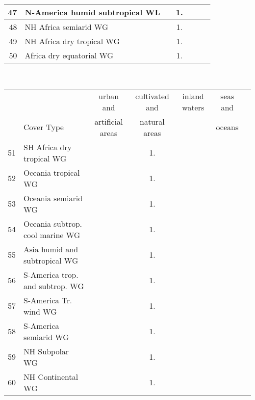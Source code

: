 {{\begin{tabular}{||r|l||c|c|c|c|c||}
 \hline
          47  & N-America humid subtropical WL                               &       &  1.   &       &       \\
 \hline
 \hline
          48  & NH Africa semiarid WG                                        &       &  1.   &       &       \\
 \hline
          49  & NH Africa dry tropical WG                                    &       &  1.   &       &       \\
 \hline
          50  & Africa dry equatorial WG                                     &       &  1.   &       &       \\
 \hline
 \end{tabular}
 \clearpage
 \medskip\
 \begin{tabular}{||r|l||c|c|c|c|c||}
 \hline
 \hline
 && urban and & cultivated and &inland waters&seas and\\
 &Cover Type& artificial areas & natural areas&&oceans\\
 \hline
 \hline
          51  & SH Africa dry tropical WG                                    &       &  1.   &       &       \\
 \hline
          52  & Oceania tropical WG                                          &       &  1.   &       &       \\
 \hline
          53  & Oceania semiarid WG                                          &       &  1.   &       &       \\
 \hline
          54  & Oceania subtrop. cool marine WG                              &       &  1.   &       &       \\
 \hline
          55  & Asia humid and subtropical WG                                &       &  1.   &       &       \\
 \hline
          56  & S-America trop. and subtrop. WG                              &       &  1.   &       &       \\
 \hline
          57  & S-America Tr. wind WG                                        &       &  1.   &       &       \\
 \hline
          58  & S-America semiarid WG                                        &       &  1.   &       &       \\
 \hline
          59  & NH Subpolar WG                                               &       &  1.   &       &       \\
 \hline
          60  & NH Continental WG                                            &       &  1.   &       &       \\

\end{tabular}}}

